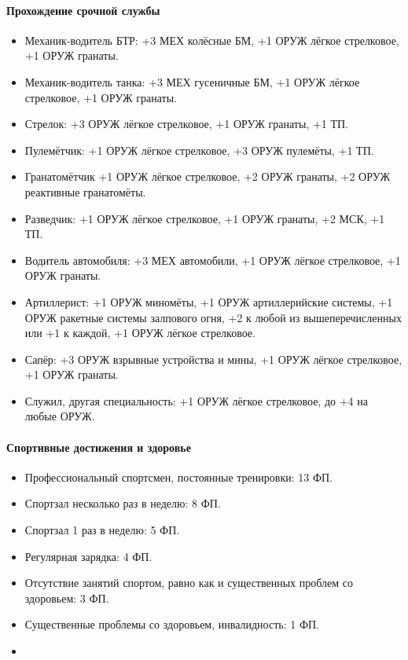 \documentclass{article}
\begin{document}
\paragraph{Прохождение срочной
службы}\label{military-service}

\begin{itemize}
\item
  Механик-водитель БТР: +3 МЕХ колёсные БМ, +1 ОРУЖ лёгкое стрелковое,
  +1 ОРУЖ гранаты.
\item
  Механик-водитель танка: +3 МЕХ гусеничные БМ, +1 ОРУЖ лёгкое
  стрелковое, +1 ОРУЖ гранаты.
\item
  Стрелок: +3 ОРУЖ лёгкое стрелковое, +1 ОРУЖ гранаты, +1 ТП.
\item
  Пулемётчик: +1 ОРУЖ лёгкое стрелковое, +3 ОРУЖ пулемёты, +1 ТП.
\item
  Гранатомётчик +1 ОРУЖ лёгкое стрелковое, +2 ОРУЖ гранаты, +2 ОРУЖ
  реактивные гранатомёты.
\item
  Разведчик: +1 ОРУЖ лёгкое стрелковое, +1 ОРУЖ гранаты, +2 МСК, +1 ТП.
\item
  Водитель автомобиля: +3 МЕХ автомобили, +1 ОРУЖ лёгкое стрелковое, +1
  ОРУЖ гранаты.
\item
  Артиллерист: +1 ОРУЖ миномёты, +1 ОРУЖ артиллерийские системы, +1 ОРУЖ
  ракетные системы залпового огня, +2 к любой из вышеперечисленных или
  +1 к каждой, +1 ОРУЖ лёгкое стрелковое.
\item
  Сапёр: +3 ОРУЖ взрывные устройства и мины, +1 ОРУЖ лёгкое стрелковое,
  +1 ОРУЖ гранаты.
\item
  Служил, другая специальность: +1 ОРУЖ лёгкое стрелковое, до +4 на
  любые ОРУЖ.
\end{itemize}

\paragraph{Спортивные достижения и
здоровье}\label{fitness-health}

\begin{itemize}
\item
  Профессиональный спортсмен, постоянные тренировки: 13 ФП.
\item
  Спортзал несколько раз в неделю: 8 ФП.
\item
  Спортзал 1 раз в неделю: 5 ФП.
\item
  Регулярная зарядка: 4 ФП.
\item
  Отсутствие занятий спортом, равно как и существенных проблем со
  здоровьем: 3 ФП.
\item
  Существенные проблемы со здоровьем, инвалидность: 1 ФП.
\item
\end{itemize}
\end{document}
